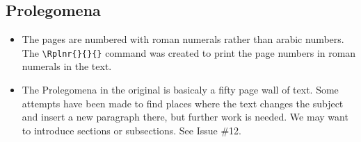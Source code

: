\documentclass{report}
\begin{document}
\subsection{Prolegomena}
\begin{itemize}
\item
The pages are numbered with roman numerals rather than arabic numbers.
The \verb+\Rplnr{}{}{}+ command
was created to print the page numbers in roman numerals in the text.
\item
The Prolegomena in the original is basicaly a fifty page wall of text. Some attempts have been made to find places where the text changes the subject and insert a new paragraph there, but further work is needed. We may want to
introduce sections or subsections. See Issue \#12.
\end{itemize}
\end{document}

